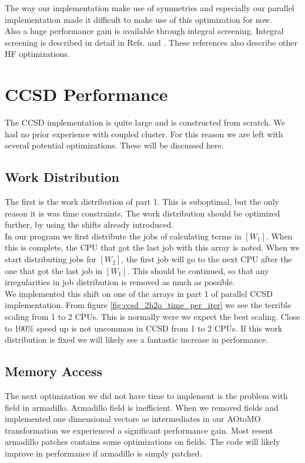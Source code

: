 \documentclass[a4paper,norsk,11pt,twoside]{report}
\begin{document}
The way our implementation make use of symmetries and especially our parallel implementation made it difficult to make use of this optimization for now. \\

Also a huge performance gain is available through integral screening. Integral screening is described in detail in Refs. \cite{helg2} and \cite{helg3}. These references also describe other HF optimizations.

\section{CCSD Performance}
The CCSD implementation is quite large and is constructed from scratch. We had no prior experience with coupled cluster. For this reason we are left with several potential optimizations. These will be discussed here.

\subsection{Work Distribution}
The first is the work distribution of part 1. This is suboptimal, but the only reason it is was time constraints. The work distribution should be optimized further, by using the shifts already introduced. \\

In our program we first distribute the jobs of calculating terms in $[W_1]$. When this is complete, the CPU that got the last job with this array is noted. When we start distributing jobs for $[W_2]$, the first job will go to the next CPU after the one that got the last job in $[W_1]$. This should be continued, so that any irregularities in job distribution is removed as much as possible. \\

We implemented this shift on one of the arrays in part 1 of parallel CCSD implementation. From figure \ref{fig:ccsd_2h2o_time_per_iter} we see the terrible scaling from 1 to 2 CPUs. This is normally were we expect the best scaling. Close to 100\% speed up is not uncommon in CCSD from 1 to 2 CPUs. If this work distribution is fixed we will likely see a fantastic increase in performance.

\subsection{Memory Access}
The next optimization we did not have time to implement is the problem with field in armadillo. Armadillo field is inefficient. When we removed fields and implemented one dimensional vectors as intermediates in our AOtoMO transformation we experienced a significant performance gain. Most resent armadillo patches contains some optimizations on fields. The code will likely improve in performance if armadillo is simply patched.  \\
\end{document}
